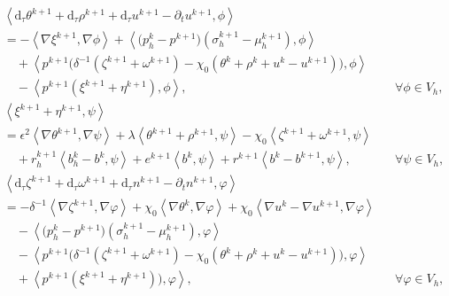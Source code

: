 \documentclass[11pt, reqno]{amsart}
\theoremstyle{definition}
\numberwithin{equation}{section}
\newcommand{\dtt}{\mathrm{d}_\tau}
\newcommand{\inpro}[2]{\left\langle#1,#2\right\rangle}
\begin{document}
\begin{subequations}\label{equ:fem sub euler}
	\begin{alignat}{2}
		&\label{equ:fem euler sub u}
		\inpro{\dtt \theta^{k+1}+ \dtt \rho^{k+1} + \dtt u^{k+1}- \partial_t u^{k+1}}{\phi}
		\nonumber\\
		&=
		-\inpro{\nabla \xi^{k+1}}{\nabla \phi}
		+
		\inpro{\big(p_h^k- p^{k+1}\big) (\sigma_h^{k+1}-\mu_h^{k+1})}{\phi}
		\nonumber\\
		&\quad
		+
		\inpro{p^{k+1} \big(\delta^{-1}(\zeta^{k+1}+\omega^{k+1}) - \chi_0(\theta^k+\rho^k+u^k-u^{k+1})\big)}{\phi}
		\nonumber\\
		&\quad
		- \inpro{p^{k+1} (\xi^{k+1}+\eta^{k+1})}{\phi}
		, \quad &&\forall \phi \in V_h,
		\\[2ex]
		&\inpro{\xi^{k+1}+\eta^{k+1}}{\psi}
		\nonumber\\
		&=
		\epsilon^2 \inpro{\nabla \theta^{k+1}}{\nabla \psi}
		+
		\lambda \inpro{\theta^{k+1}+ \rho^{k+1}}{\psi}
		-
		\chi_0 \inpro{\zeta^{k+1}+\omega^{k+1}}{\psi}
		\nonumber\\
		&\quad
		+
		r_h^{k+1} \inpro{b_h^k-b^k}{\psi}
		+ 
		e^{k+1} \inpro{b^k}{\psi}
		+
		r^{k+1} \inpro{b^k-b^{k+1}}{\psi},
		\label{equ:fem euler sub mu}
		\quad &&\forall \psi\in V_h,
		\\[2ex]
		\label{equ:fem euler sub n}
		&\inpro{\dtt \zeta^{k+1}+ \dtt \omega^{k+1}+ \dtt n^{k+1}-\partial_t n^{k+1}}{\varphi}
		\nonumber\\
		&=
		-\delta^{-1} \inpro{\nabla \zeta^{k+1}}{\nabla \varphi}
		+\chi_0 \inpro{\nabla \theta^k}{\nabla \varphi}
		+\chi_0 \inpro{\nabla u^k-\nabla u^{k+1}}{\nabla \varphi}
		\nonumber\\
		&\quad
		-
		\inpro{\big(p_h^k- p^{k+1} \big) (\sigma_h^{k+1}-\mu_h^{k+1})}{\varphi}
		\nonumber\\
		&\quad
		-
		\inpro{p^{k+1} \big(\delta^{-1}(\zeta^{k+1}+\omega^{k+1}) - \chi_0(\theta^k+\rho^k+u^k-u^{k+1})\big)}{\varphi}
		\nonumber\\
		&\quad
		+ \inpro{p^{k+1} (\xi^{k+1}+\eta^{k+1})\big)}{\varphi}
		, \quad &&\forall \varphi \in V_h,
	\end{alignat}
\end{subequations}
\end{document}
